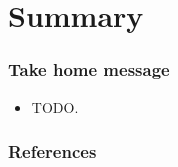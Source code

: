 \documentclass[aspectratio=169]{beamer}
\begin{document}
\section{Summary}

\begin{frame}
	\frametitle{Take home message}
	\begin{itemize}
		\item TODO.
	\end{itemize}
\end{frame}

\begin{frame}[allowframebreaks]
	\frametitle{References}
	\printbibliography
\end{frame}
\end{document}
